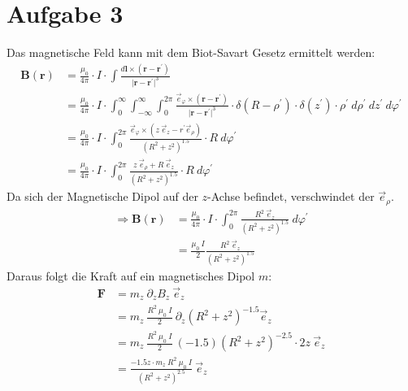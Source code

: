 \documentclass[11pt a4paper]{article}
\begin{document}
\section*{Aufgabe 3}
Das magnetische Feld kann mit dem Biot-Savart Gesetz ermittelt werden:
\begin{align*}
	\mathbf B(\mathbf r) 
	&= \frac{\mu_0}{4\pi} \cdot I \cdot \int 
	\frac{d \mathbf{l} \times (\mathbf{r} - \mathbf{r^\prime})}
	{\vert \mathbf{r} - \mathbf{r^\prime} \vert^3} \\
	&= \frac{\mu_0}{4\pi} \cdot I \cdot 
	\int_0^\infty \int_{-\infty}^\infty \int_0^{2\pi}
	\frac{\vec e_\varphi \times 
	(\mathbf{r} - \mathbf{r^\prime})}
	{\vert \mathbf{r} - \mathbf{r^\prime} \vert^3} \cdot
	\delta(R - \rho^\prime) \cdot \delta(z^\prime) \cdot \rho^\prime
	\ d\rho^\prime \ dz^\prime \ d\varphi^\prime \\
	&= \frac{\mu_0}{4\pi} \cdot I \cdot 
	\int_0^{2\pi}
	\frac{ \vec e_\varphi \times 
	(z \ \vec e_z - r^\prime \vec e_\rho)}
	{\left( R^2 + z^2 \right)^{1.5} } \cdot
	R
	\ d\varphi^\prime \\
	&= \frac{\mu_0}{4\pi} \cdot I \cdot 
	\int_0^{2\pi}
	\frac{z \ \vec e_\rho + R \ \vec e_z}
	{\left( R^2 + z^2 \right)^{1.5} } \cdot
	R
	\ d\varphi^\prime
\end{align*}
Da sich der Magnetische Dipol auf der $z$-Achse befindet, verschwindet der
$\vec e_\rho$.
\begin{align*}
	\Rightarrow
	\mathbf B(\mathbf r) 
	&= \frac{\mu_0}{4\pi} \cdot I \cdot 
	\int_0^{2\pi}
	\frac{R^2 \ \vec e_z}
	{\left( R^2 + z^2 \right)^{1.5} }
	\ d\varphi^\prime \\
	&= \frac{\mu_0 \ I}{2}
	\frac{R^2 \ \vec e_z}
	{\left( R^2 + z^2 \right)^{1.5} }
\end{align*}
Daraus folgt die Kraft auf ein magnetisches Dipol $m$:
\begin{align*}
	\mathbf F 
	&= m_z \ \partial_z B_z \ \vec e_z \\
	&= m_z \ 
	\frac{R^2 \ \mu_0 \ I}{2}
	\ \partial_z 
	\left( R^2 + z^2 \right)^{-1.5}
	\vec e_z \\
	&= m_z \ 
	\frac{R^2 \ \mu_0 \ I}{2}
	\ (-1.5)
	\left( R^2 + z^2 \right)^{-2.5} \cdot 2z \
	\vec e_z \\
	&= \frac{-1.5 z \cdot m_z \ R^2 \ \mu_0 \ I}
	{(R^2 + z^2)^{2.5}} \ \vec e_z
\end{align*}
\end{document}
